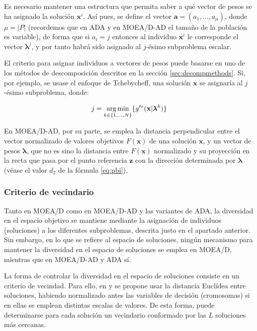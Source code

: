 Es necesario mantener una estructura que permita saber a qué vector de pesos se ha asignado la solución $\textbf{x}^i$. Así pues, se define el vector $\textbf{a} = (a_1,\dots,a_\mu)$, donde $\mu=|P|$ (recordemos que en ADA y en MOEA/D-AD el tamaño de la población es variable), de forma que si $a_i = j$ entonces al individuo $\textbf{x}^i$ le corresponde el vector $\boldsymbol\lambda^{j}$, y por tanto habrá sido asignado al $j$-ésimo subproblema escalar.

El criterio para asignar individuos a vectores de pesos puede basarse en uno de los métodos de descomposición descritos en la sección \ref{sec:decompmethods}. Si, por ejemplo, se usase el enfoque de Tchebycheff, una solución $\textbf{x}$ se asignaría al $j$-ésimo subproblema, donde:

\begin{equation}
 j = \operatorname*{arg\,min}_{k\in\{1,\dots,N\}}\{g^{te}(\textbf{x}|\boldsymbol\lambda^k)\}
\end{equation}

En MOEA/D-AD, por su parte, se emplea la distancia perpendicular entre el vector normalizado de valores objetivos $F(\textbf{x})$ de una solución $\textbf{x}$, y un vector de pesos $\boldsymbol\lambda$, que no es sino la distancia entre $F(\textbf{x})$ normalizado y su proyección en la recta que pasa por el punto referencia $\textbf{z}$ con la dirección determinada por $\boldsymbol\lambda$ (véase el valor $d_2$ de la fórmula \ref{eq:pbi}).


\subsubsection{Criterio de vecindario}\label{sec:neigh}

Tanto en MOEA/D como en MOEA/D-AD y las variantes de ADA, la diversidad en el espacio objetivo se mantiene mediante la asignación de individuos (soluciones) a los diferentes subproblemas, descrita justo en el apartado anterior. Sin embargo, en lo que se refiere al espacio de soluciones, ningún mecanismo para mantener la diversidad en el espacio de soluciones se emplea en MOEA/D, mientras que en MOEA/D-AD y ADA sí.

La forma de controlar la diversidad en el espacio de soluciones consiste en un criterio de vecindad. Para ello, en \cite{tanabe2019framework} y \cite{tanabe2018decomposition} se propone usar la distancia Euclídea entre soluciones, habiendo normalizado antes las variables de decisión (cromosomas) si en ellas se emplean distintas escalas de valores. De esta forma, puede determinarse para cada solución un vecindario conformado por las $L$ soluciones más cercanas.

